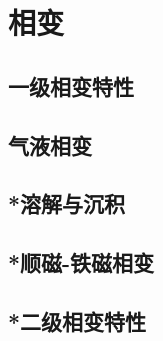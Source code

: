 

\section{相变}\label{13-2}

\subsection{一级相变特性}\label{13-2-1}

\subsection{气液相变}\label{13-2-2}

\subsection{*溶解与沉积}\label{13-2-3}

\subsection{*顺磁-铁磁相变}\label{13-2-4}

\subsection{*二级相变特性}\label{13-2-4}